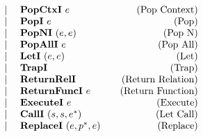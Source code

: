 \begin{align*}
\begin{array}{lcccrlr}
    &&&& | & ~ \textbf{PopCtxI} ~ e &\quad\text{(Pop Context)} \\
    &&&& | & ~ \textbf{PopI} ~ e &\quad\text{(Pop)} \\
    &&&& | & ~ \textbf{PopNI} ~ (e, e) &\quad\text{(Pop N)} \\
    &&&& | & ~ \textbf{PopAllI} ~ e &\quad\text{(Pop All)} \\
    &&&& | & ~ \textbf{LetI} ~ (e, e) &\quad\text{(Let)} \\
    &&&& | & ~ \textbf{TrapI} &\quad\text{(Trap)} \\
    &&&& | & ~ \textbf{ReturnRelI} &\quad\text{(Return Relation)} \\
    &&&& | & ~ \textbf{ReturnFuncI} ~ e &\quad\text{(Return Function)} \\
    &&&& | & ~ \textbf{ExecuteI} ~ e &\quad\text{(Execute)} \\
    &&&& | & ~ \textbf{CallI} ~ (s, s, e^*) &\quad\text{(Let Call)} \\
    &&&& | & ~ \textbf{ReplaceI} ~ (e, p^*, e) &\quad\text{(Replace)} \\
\end{array}
\end{align*}
\newpage

